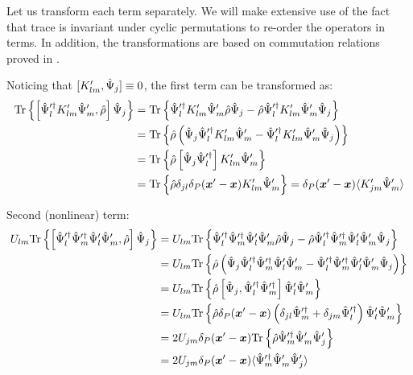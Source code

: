 Let us transform each term separately.
We will make extensive use of the fact that trace is invariant under cyclic permutations to re-order the operators in terms.
In addition, the transformations are based on commutation relations proved in .

Noticing that $[ K_{lm}^\prime, \hat{\Psi}_j ] \equiv 0$, the first term can be transformed as:
\begin{equation*}
\begin{split}
	\mathrm{Tr} \left\{ 
		\left[
			\hat{\Psi}_l^{\prime\dagger} K_{lm}^\prime \hat{\Psi}_m^\prime,
			\hat{\rho}
		\right] \hat{\Psi}_j
	 \right\}
	& = \mathrm{Tr} \left\{ 
		\hat{\Psi}_l^{\prime\dagger} K_{lm}^\prime \hat{\Psi}_m^\prime \hat{\rho} \hat{\Psi}_j
		- \hat{\rho} \hat{\Psi}_l^{\prime\dagger} K_{lm}^\prime \hat{\Psi}_m^\prime \hat{\Psi}_j
	 \right\} \\
	& = \mathrm{Tr} \left\{ 
		\hat{\rho} \left(
			\hat{\Psi}_j \hat{\Psi}_l^{\prime\dagger} K_{lm}^\prime \hat{\Psi}_m^\prime
			- \hat{\Psi}_l^{\prime\dagger} K_{lm}^\prime \hat{\Psi}_m^\prime \hat{\Psi}_j
		\right)
	 \right\} \\
	& = \mathrm{Tr} \left\{ 
		\hat{\rho} \left[
			\hat{\Psi}_j \hat{\Psi}_l^{\prime\dagger}
		\right] K_{lm}^\prime \hat{\Psi}_m^\prime
	 \right\} \\
	& = \mathrm{Tr} \left\{ 
		\hat{\rho} \delta_{jl} \delta_P(\boldsymbol{x}^\prime - \boldsymbol{x}) K_{lm}^\prime \hat{\Psi}_m^\prime
	 \right\}
	= \delta_P(\boldsymbol{x}^\prime - \boldsymbol{x}) \langle K_{jm}^\prime \hat{\Psi}_m^\prime \rangle
\end{split}
\end{equation*}

Second (nonlinear) term:
\begin{equation*}
\begin{split}
	U_{lm} \mathrm{Tr} \left\{ 
		\left[
			\hat{\Psi}_l^{\prime\dagger} \hat{\Psi}_m^{\prime\dagger}
			\hat{\Psi}_l^\prime \hat{\Psi}_m^\prime,
			\hat{\rho}
		\right] \hat{\Psi}_j
	 \right\}
	& = U_{lm} \mathrm{Tr} \left\{ 
		\hat{\Psi}_l^{\prime\dagger} \hat{\Psi}_m^{\prime\dagger}
		\hat{\Psi}_l^\prime \hat{\Psi}_m^\prime \hat{\rho} \hat{\Psi}_j
		- \hat{\rho} \hat{\Psi}_l^{\prime\dagger} \hat{\Psi}_m^{\prime\dagger}
		\hat{\Psi}_l^\prime \hat{\Psi}_m^\prime \hat{\Psi}_j
	 \right\} \\
	& = U_{lm} \mathrm{Tr} \left\{ 
		\hat{\rho} \left(
			\hat{\Psi}_j \hat{\Psi}_l^{\prime\dagger} \hat{\Psi}_m^{\prime\dagger}
			\hat{\Psi}_l^\prime \hat{\Psi}_m^\prime
			- \hat{\Psi}_l^{\prime\dagger} \hat{\Psi}_m^{\prime\dagger}
			\hat{\Psi}_l^\prime \hat{\Psi}_m^\prime \hat{\Psi}_j
		\right)
	 \right\} \\
	& = U_{lm} \mathrm{Tr} \left\{ 
		\hat{\rho} \left[
			\hat{\Psi}_j, \hat{\Psi}_l^{\prime\dagger} \hat{\Psi}_m^{\prime\dagger}
		\right] \hat{\Psi}_l^\prime \hat{\Psi}_m^\prime
	 \right\} \\
	& = U_{lm} \mathrm{Tr} \left\{ 
		\hat{\rho} \delta_P(\boldsymbol{x}^\prime - \boldsymbol{x}) \left(
			\delta_{jl} \hat{\Psi}_m^{\prime\dagger}
			+ \delta_{jm} \hat{\Psi}_l^{\prime\dagger}
		\right) \hat{\Psi}_l^\prime \hat{\Psi}_m^\prime
	 \right\} \\
	& = 2 U_{jm} \delta_P(\boldsymbol{x}^\prime - \boldsymbol{x}) \mathrm{Tr} \left\{ 
		\hat{\rho} \hat{\Psi}_m^{\prime\dagger} \hat{\Psi}_m^\prime \hat{\Psi}_j^\prime
	 \right\} \\
	& = 2 U_{jm} \delta_P(\boldsymbol{x}^\prime - \boldsymbol{x}) \langle
		\hat{\Psi}_m^{\prime\dagger} \hat{\Psi}_m^\prime \hat{\Psi}_j^\prime
	\rangle
\end{split}
\end{equation*}

